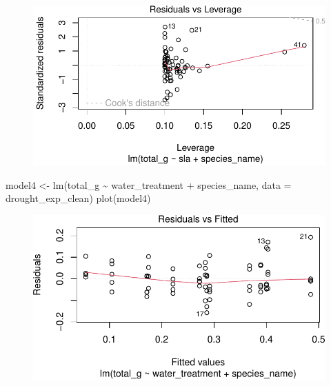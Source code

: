 \documentclass[
  letterpaper,
  DIV=11,
  numbers=noendperiod]{scrartcl}
\newenvironment{Shaded}{\begin{snugshade}}{\end{snugshade}}
\newcommand{\AttributeTok}[1]{\textcolor[rgb]{0.40,0.45,0.13}{#1}}
\newcommand{\FunctionTok}[1]{\textcolor[rgb]{0.28,0.35,0.67}{#1}}
\newcommand{\NormalTok}[1]{\textcolor[rgb]{0.00,0.23,0.31}{#1}}
\newcommand{\OtherTok}[1]{\textcolor[rgb]{0.00,0.23,0.31}{#1}}
\newcommand{\SpecialCharTok}[1]{\textcolor[rgb]{0.37,0.37,0.37}{#1}}
\begin{document}
\begin{figure}[H]

{\centering \includegraphics{Odile_Gabbiani_homework-03_files/figure-pdf/unnamed-chunk-10-4.pdf}

}

\end{figure}

\begin{Shaded}
\begin{Highlighting}[]
\NormalTok{model4 }\OtherTok{\textless{}{-}} \FunctionTok{lm}\NormalTok{(total\_g }\SpecialCharTok{\textasciitilde{}}\NormalTok{ water\_treatment }\SpecialCharTok{+}\NormalTok{ species\_name, }
             \AttributeTok{data =}\NormalTok{ drought\_exp\_clean)}
\FunctionTok{plot}\NormalTok{(model4)}
\end{Highlighting}
\end{Shaded}

\begin{figure}[H]

{\centering \includegraphics{Odile_Gabbiani_homework-03_files/figure-pdf/unnamed-chunk-11-1.pdf}

}

\end{figure}
\end{document}
